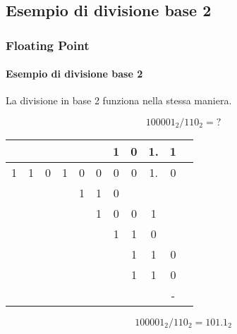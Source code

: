\documentclass{beamer}
\begin{document}
	\subsection{Esempio di divisione base 2}
  \begin{frame}
	    \frametitle{Floating Point}
	    \framesubtitle{Esempio di divisione base 2}
				    
	    La divisione in base 2 funziona nella stessa maniera.
	    
	    $$100001_{2} / 110_{2} = ?$$
	    
	    \pause
	    \vspace{2em}
	    \begin{center}
	    		\setlength{\tabcolsep}{2pt}
	    		\begin{tabular}{ccc|cccccccc}
	    				&   &   &   &   &   & 1 & 0 & 1. & 1	\\
	    		  \hline    			
	    			1 & 1 & 0 & 1 & 0 & 0 & 0 & 0 & 1. & 0 \\
	    			  &   &   &   & 1 & 1 & 0 &   &   &    \\
	    			\hline
	    			  &   &   &   &   & 1 & 0 & 0 & 1 &    \\
	    			  &   &   &   &   &   & 1 & 1 & 0 &    \\
	    			\hline
	    			  &   &   &   &   &   &   & 1 & 1 & 0  \\
	    			  &   &   &   &   &   &   & 1 & 1 & 0  \\
	    			\hline
	    			  &   &   &   &   &   &   &   &   & -  \\
	    		\end{tabular}
	    \end{center}
	    \pause
	    \vspace{2em}
	    $$100001_{2} / 110_{2} = 101.1_{2}$$
	\end{frame}
\end{document}
